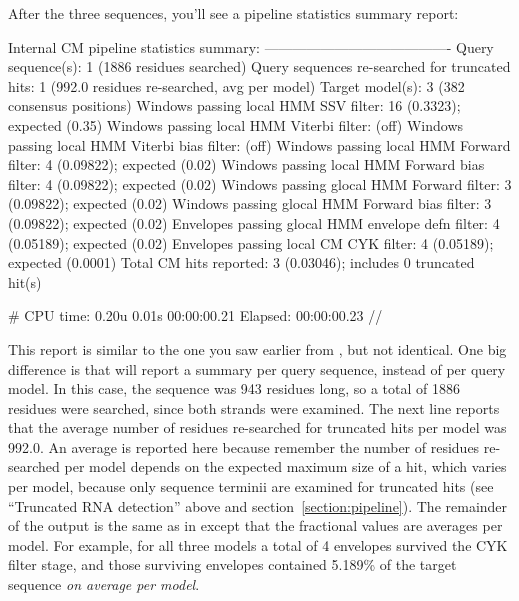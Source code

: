 After the three sequences, you'll see a pipeline statistics summary
report:

\begin{widesreoutput}
Internal CM pipeline statistics summary:
----------------------------------------
Query sequence(s):                                               1  (1886 residues searched)
Query sequences re-searched for truncated hits:                  1  (992.0 residues re-searched, avg per model)
Target model(s):                                                 3  (382 consensus positions)
Windows   passing  local HMM SSV           filter:              16  (0.3323); expected (0.35)
Windows   passing  local HMM Viterbi       filter:                  (off)
Windows   passing  local HMM Viterbi  bias filter:                  (off)
Windows   passing  local HMM Forward       filter:               4  (0.09822); expected (0.02)
Windows   passing  local HMM Forward  bias filter:               4  (0.09822); expected (0.02)
Windows   passing glocal HMM Forward       filter:               3  (0.09822); expected (0.02)
Windows   passing glocal HMM Forward  bias filter:               3  (0.09822); expected (0.02)
Envelopes passing glocal HMM envelope defn filter:               4  (0.05189); expected (0.02)
Envelopes passing  local CM  CYK           filter:               4  (0.05189); expected (0.0001)
Total CM hits reported:                                          3  (0.03046); includes 0 truncated hit(s)

# CPU time: 0.20u 0.01s 00:00:00.21 Elapsed: 00:00:00.23
//
\end{widesreoutput}

This report is similar to the one you saw earlier from
, but not identical. One big difference is that
 will report a summary per query sequence, instead of per
query model. In this case, the sequence was 943 residues long, so a
total of 1886 residues were searched, since both strands were
examined. The next line reports that the average number of residues
re-searched for truncated hits per model was 992.0. An average is
reported here because remember the number of residues re-searched per
model depends on the expected maximum size of a hit, which varies per
model, because only sequence terminii are examined for truncated hits
(see ``Truncated RNA detection'' above and
section~\ref{section:pipeline}).  The remainder of the output is the
same as in  except that the fractional values are
averages per model. For example, for all three models a total of 4
envelopes survived the CYK filter stage, and those surviving envelopes
contained 5.189\% of the target sequence \emph{on average per model}.

